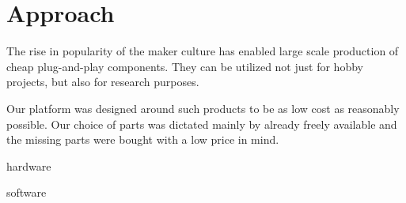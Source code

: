 \documentclass[class=report, crop=false]{standalone}
\begin{document}
\chapter{Approach}\label{cha:approach}

The rise in popularity of the maker culture has enabled large scale production of cheap plug-and-play components. They can be utilized not just for hobby projects, but also for research purposes.

Our platform was designed around such products to be as low cost as reasonably possible. Our choice of parts was dictated mainly by already freely available and the missing parts were bought with a low price in mind.

{hardware}

{software}
\end{document}
